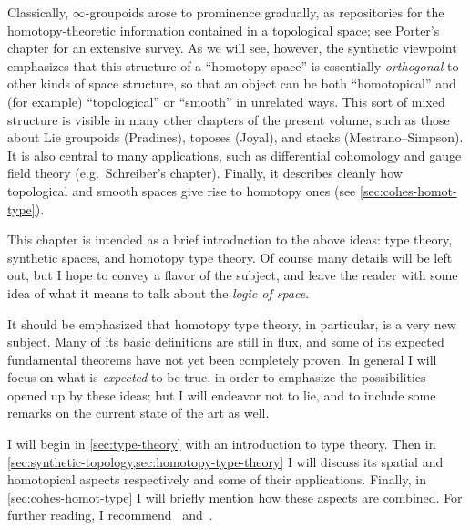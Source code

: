 \documentclass[10pt]{article}
\def\oo{\ensuremath{\infty}}
\numberwithin{equation}{section}
\begin{document}
Classically, \oo-groupoids arose to prominence gradually, as repositories for the homotopy-theoretic information contained in a topological space; see Porter's chapter for an extensive survey.
As we will see, however, the synthetic viewpoint emphasizes that this structure of a ``homotopy space'' is essentially \emph{orthogonal} to other kinds of space structure, so that an object can be both ``homotopical'' and (for example) ``topological'' or ``smooth'' in unrelated ways.
This sort of mixed structure is visible in many other chapters of the present volume, such as those about Lie groupoids (Pradines), toposes (Joyal), and stacks (Mestrano--Simpson).
It is also central to many applications, such as differential cohomology and gauge field theory (e.g.\ Schreiber's chapter).
Finally, it describes cleanly how topological and smooth spaces give rise to homotopy ones (see \cref{sec:cohes-homot-type}).

This chapter is intended as a brief introduction to the above ideas: type theory, synthetic spaces, and homotopy type theory.
Of course many details will be left out, but I hope to convey a flavor of the subject, and leave the reader with some idea of what it means to talk about the \emph{logic of space}.

It should be emphasized that homotopy type theory, in particular, is a very new subject.
Many of its basic definitions are still in flux, and some of its expected fundamental theorems have not yet been completely proven.
In general I will focus on what is \emph{expected} to be true, %
in order to emphasize the possibilities opened up by these ideas; but I will endeavor not to lie, and to include some remarks on the current state of the art as well.

I will begin in \cref{sec:type-theory} with an introduction to type theory.
Then in \cref{sec:synthetic-topology,sec:homotopy-type-theory} I will discuss its spatial and homotopical aspects respectively and some of their applications.
Finally, in \cref{sec:cohes-homot-type} I will briefly mention how these aspects are combined. %
For further reading, I recommend~\cite{awodey:tt-and-htpy,apw:vvu-hott,pw:hottvvuf,shulman:synhott} and~\cite{hottbook}.
\end{document}
